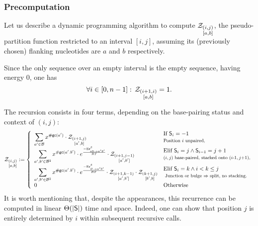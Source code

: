 \subsubsection{Precomputation}
Let us describe a dynamic programming algorithm to compute $\Z{i,j}{a,b}$, the pseudo-partition function restricted to an interval $[i,j]$, assuming its (previously chosen) flanking nucleotides are $a$ and $b$ respectively. 

Since the only sequence over an empty interval is the empty sequence, having energy $0$, one has
\begin{equation}
	\forall i \in [0,n-1]:\, \Z{i+1,i}{a,b}=1.
	\label{eq:Z_in}
\end{equation}


The recursion consists in four terms, depending on the base-pairing status and context of $(i,j)$:
\begin{equation*}
	\Z{i,j}{a,b}:=\left\{
  \begin{array}{ll}
  		\displaystyle
      \sum_{a'\in \B}  
      x^{\gc(a')}
      \cdot\Z{i+1,j}{a',b} &\begin{array}{@{}l@{}}\text{If }\Target_{i}=-1\\ \text{\relsize{-1}Position $i$ unpaired,}\end{array}\\
      \displaystyle
      \sum_{a',b'\in \B^2}
			 x^{\gc(a'.b')}
			 \cdot e^{\frac{-\ES^{\beta}_{ab \to a'b'}}{RT}}
			 \cdot \Z{i+1,j-1}{a',b'}&
\begin{array}{@{}l@{}}\text{Elif }\Target_i=j \land \Target_{i-1}=j+1\\ \text{\relsize{-1}$(i,j)$ base-paired, stacked onto $(i$-$1,j$+$1)$,}\end{array}
			 \\
			 \displaystyle
      \sum_{a',b'\in \B^2}
      x^{\gc(a'.b')}
			\cdot e^{\frac{-\ES^{\beta}_{\varnothing\to a'b'}}{RT}}
      \cdot\Z{i+1,k-1}{a',b'}
      \cdot\Z{k+1,j}{b',b} & 
\begin{array}{@{}l@{}}\text{Elif }\Target_i=k \land i < k \leq j\\
\text{\relsize{-1} Junction or bulge $\Rightarrow$ split, no stacking.}
\end{array}
\\
      0 &\text{Otherwise}
	\end{array}\right.
\label{eq:Z_rec}
\end{equation*}
It is worth mentioning that, despite the appearances, this recurrence can be computed in linear $\Theta(|\text{\sf S}|)$ time and space. Indeed, one can show that position $j$ is entirely determined by $i$ within subsequent recursive calls. 

